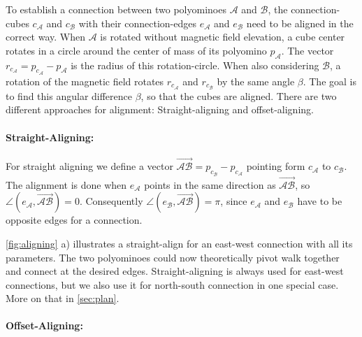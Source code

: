 To establish a connection between two polyominoes $\mathcal{A}$ and $\mathcal{B}$, the connection-cubes $c_\mathcal{A}$ and $c_\mathcal{B}$ with their connection-edges $e_\mathcal{A}$ and $e_\mathcal{B}$ need to be aligned in the correct way.
When $\mathcal{A}$ is rotated without magnetic field elevation, a cube center rotates in a circle around the center of mass of its polyomino $p_\mathcal{A}$.
The vector $r_{c_\mathcal{A}} = p_{c_\mathcal{A}} - p_\mathcal{A}$ is the radius of this rotation-circle.
When also considering $\mathcal{B}$, a rotation of the magnetic field rotates $r_{c_\mathcal{A}}$ and $r_{c_\mathcal{B}}$ by the same angle $\beta$.
The goal is to find this angular difference $\beta$, so that the cubes are aligned.
There are two different approaches for alignment: Straight-aligning and offset-aligning.

\paragraph{Straight-Aligning:}

For straight aligning we define a vector $\overrightarrow{\mathcal{A}\mathcal{B}} = p_{c_\mathcal{B}} - p_{c_\mathcal{A}}$ pointing form $c_\mathcal{A}$ to $c_\mathcal{B}$.
The alignment is done when $e_\mathcal{A}$ points in the same direction as $\overrightarrow{\mathcal{A}\mathcal{B}}$, so $\angle \left( e_\mathcal{A}, \overrightarrow{\mathcal{A}\mathcal{B}} \right) = 0$.
Consequently $\angle \left( e_\mathcal{B}, \overrightarrow{\mathcal{A}\mathcal{B}} \right) = \pi$, since $e_\mathcal{A}$ and $e_\mathcal{B}$ have to be opposite edges for a connection.

\autoref{fig:aligning} a) illustrates a straight-align for an east-west connection with all its parameters.
The two polyominoes could now theoretically pivot walk together and connect at the desired edges.
Straight-aligning is always used for east-west connections, but we also use it for north-south connection in one special case. More on that in \autoref{sec:plan}.

\paragraph{Offset-Aligning:}

